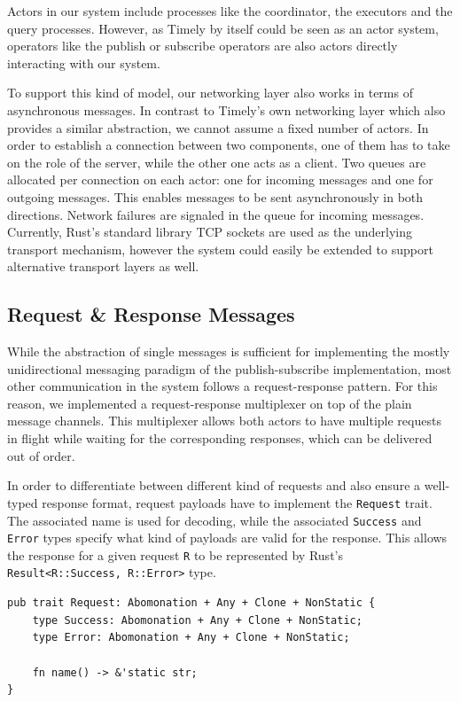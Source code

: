 Actors in our system include processes like the coordinator, the executors 
and the query processes. However, as Timely by itself could be seen as an
actor system, operators like the publish or subscribe operators are also actors
directly interacting with our system.

To support this kind of model, our networking layer also works in terms of
asynchronous messages. In contrast to Timely's own networking layer which also
provides a similar abstraction, we cannot assume a fixed number of actors.
In order to establish a connection between two components, one of them has to
take on the role of the server, while the other one acts as a client. Two
queues are allocated per connection on each actor: one for incoming messages
and one for outgoing messages. This enables messages to be sent asynchronously
in both directions. Network failures are signaled in the queue for incoming
messages. Currently, Rust's standard library TCP sockets are used as the
underlying transport mechanism, however the system could easily be extended to
support alternative transport layers as well.

\subsection{Request \& Response Messages} \label{sec:reqresp}

While the abstraction of single messages is sufficient for implementing the
mostly unidirectional messaging paradigm of the publish-subscribe implementation,
most other communication in the system follows a request-response pattern.
For this reason, we implemented a request-response multiplexer on
top of the plain message channels. This multiplexer allows both actors to have
multiple requests in flight while waiting for the corresponding responses,
which can be delivered out of order.

In order to differentiate between different kind of requests and also ensure a
well-typed response format, request payloads have to implement the \lstinline{Request}
trait. The associated name is used for decoding, while the associated \lstinline{Success}
and \lstinline{Error} types specify what kind of payloads are valid for the response.
This allows the response for a given request \lstinline{R} to be represented by
Rust's \lstinline{Result<R::Success, R::Error>} type.

\begin{lstlisting}[caption={[Request trait]In order for a type to be used as a
request message, it needs to implement the \lstinline{Request} trait. The name allows
request handlers to differentiate between different types of requests, while the associated
types forces them to issue well-formed responses.
The trait bounds are explained in section \ref{sec:serialization}.}]
pub trait Request: Abomonation + Any + Clone + NonStatic {
    type Success: Abomonation + Any + Clone + NonStatic;
    type Error: Abomonation + Any + Clone + NonStatic;

    fn name() -> &'static str;
}
\end{lstlisting}

